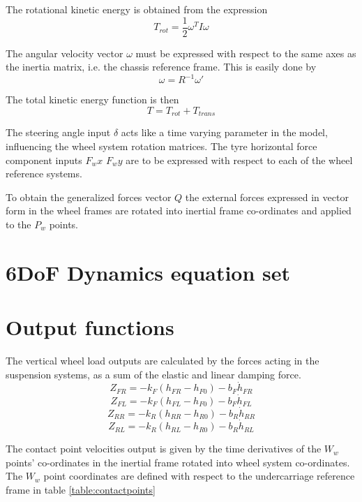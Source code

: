 The rotational kinetic energy is obtained from the expression
$$ T_{rot} = \frac{1}{2}\omega^T I \omega $$

The angular velocity vector $\omega$ must be expressed with respect to the same axes as the inertia matrix, i.e. the chassis reference frame. This is easily done by
$$\omega = R^{-1}\omega'$$

The total kinetic energy function is then
$$ T = T_{rot} + T_{trans} $$

The steering angle input $\delta$ acts like a time varying parameter in the model, influencing the wheel system rotation matrices.
The tyre horizontal force component inputs $F_wx$ $F_wy$ are to be expressed with respect to each of the wheel reference systems.

To obtain the generalized forces vector $Q$ the external forces expressed in vector form in the wheel frames are rotated into inertial frame co-ordinates and applied to the $P_w$ points.

\section{6DoF Dynamics equation set}
\label{sec:6dofeq}

\section{Output functions}
\label{sec:6dofout}
The vertical wheel load outputs are calculated by the forces acting in the suspension systems, as a sum of the elastic and linear damping force.
$$Z_{FR} = - k_F (h_{FR} - h_{F0}) - b_F \dot h_{FR} $$
$$Z_{FL} = - k_F (h_{FL} - h_{F0}) - b_F \dot h_{FL} $$
$$Z_{RR} = - k_R (h_{RR} - h_{R0}) - b_R \dot h_{RR} $$
$$Z_{RL} = - k_R (h_{RL} - h_{R0}) - b_R \dot h_{RL} $$

The contact point velocities output is given by the time derivatives of the $W_w$ points' co-ordinates in the inertial frame rotated into wheel system co-ordinates. The $W_w$ point coordinates are defined with respect to the undercarriage reference frame in table \ref{table:contactpoints}

